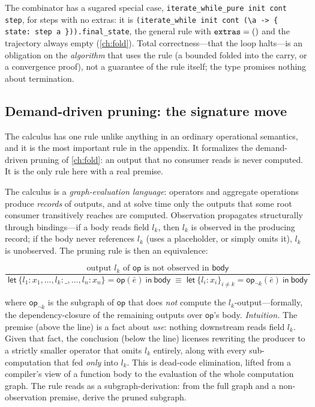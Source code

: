 The combinator has a sugared special case,
\lstinline[style=l4style]|iterate_while_pure init cont step|, for steps with no
extras: it is \lstinline[style=l4style]|(iterate_while init cont (\a -> { state: step a })).final_state|,
the general rule with $\texttt{extras} = ()$ and the trajectory always empty
(\cref{ch:fold}). Total correctness---that the loop halts---is an obligation on
the \emph{algorithm} that uses the rule (a bounded  folded into the
carry, or a convergence proof), not a guarantee of the rule itself; the type
promises nothing about termination.

\subsection{Demand-driven pruning: the signature move}
\label{app:calc:pruning}

The calculus has one rule unlike anything in an ordinary operational
semantics, and it is the most important rule in the appendix. It formalizes the
demand-driven pruning of \cref{ch:fold}: an output that no consumer reads is never
computed. It is the only rule here with a real premise.

The calculus is a \emph{graph-evaluation language}: operators and aggregate
operations produce \emph{records} of outputs, and at solve time only the outputs
that some root consumer transitively reaches are computed. Observation propagates
structurally through bindings---if a body reads field $l_k$, then $l_k$ is
observed in the producing record; if the body never references $l_k$ (uses a
\code{\_} placeholder, or simply omits it), $l_k$ is unobserved. The pruning rule
is then an equivalence:

\[
\dfrac{\;\text{output } l_k \text{ of } \textsf{op} \text{ is not observed in } \textsf{body}\;}
{\;
  \textsf{let}\ \{l_1\!:\!x_1, \dots, l_k\!:\!\_, \dots, l_n\!:\!x_n\}
    = \textsf{op}(\bar{e})\ \textsf{in}\ \textsf{body}
  \;\equiv\;
  \textsf{let}\ \{l_i\!:\!x_i\}_{i \neq k} = \textsf{op}_{\neg k}(\bar{e})\ \textsf{in}\ \textsf{body}
\;}
\]

\noindent where $\textsf{op}_{\neg k}$ is the subgraph of $\textsf{op}$ that does
\emph{not} compute the $l_k$-output---formally, the dependency-closure of the
remaining outputs over $\textsf{op}$'s body. \emph{Intuition.} The premise (above
the line) is a fact about \emph{use}: nothing downstream reads field $l_k$. Given
that fact, the conclusion (below the line) licenses rewriting the producer to a
strictly smaller operator that omits $l_k$ entirely, along with every
sub-computation that fed \emph{only} into $l_k$. This is dead-code elimination,
lifted from a compiler's view of a function body to the evaluation of the whole
computation graph. The rule reads as a subgraph-derivation: from the full graph
and a non-observation premise, derive the pruned subgraph.

